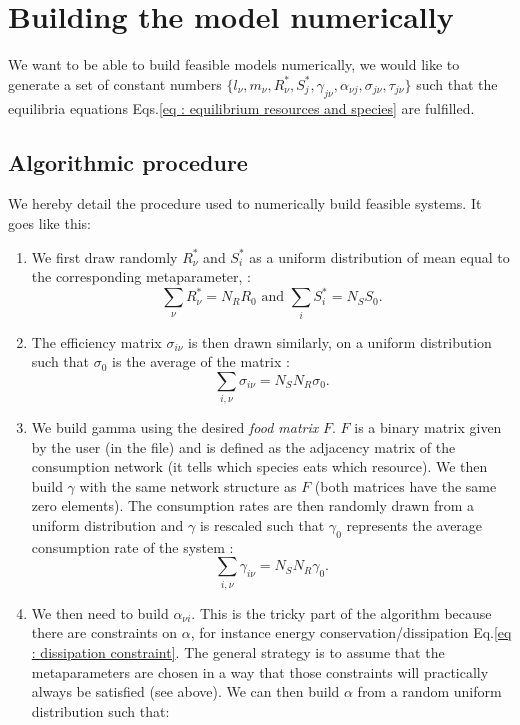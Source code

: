 \documentclass[12pt, titlepage]{report}
\begin{document}
\section{Building the model numerically}
We want to be able to build feasible models numerically, \ie we would like to generate a set of constant numbers $\{
l_\nu, m_\nu, R^*_\nu, S^*_j, \gamma_{j\nu}, \alpha_{\nu j}, \sigma_{j\nu}, \tau_{j\nu}\}$ such that the equilibria equations Eqs.\eqref{eq : equilibrium resources and species} are fulfilled.


\subsection{Algorithmic procedure}
We hereby detail the procedure used to numerically build feasible systems. It goes like this:
\begin{enumerate}
  \item We first draw randomly $R^*_\nu$
  and $S^*_i$ as a uniform distribution of mean equal to the corresponding metaparameter, \ie :
  \begin{equation}
    \sum_\nu R^*_\nu = N_R R_0 \text{ and } \sum_i S^*_i = N_S S_0.
  \end{equation}
  \item The efficiency matrix $\sigma_{i\nu}$ is then drawn similarly, on a uniform distribution such that $\sigma_0$ is the average of the matrix :
  \begin{equation}
    \sum_{i,\nu} \sigma_{i\nu} = N_S N_R \sigma_0.
  \end{equation}
  \item We build gamma using the desired \textit{food matrix} $F$. $F$ is a binary matrix given by the user (in the  file) and is defined as the adjacency matrix of the consumption network (\ie it tells which species eats which resource). We then build $\gamma$ with the same network structure as $F$ (\ie both matrices have the same zero elements). The consumption rates are then randomly drawn from a uniform distribution and $\gamma$ is rescaled such that $\gamma_0$ represents the average consumption rate of the system :
  \begin{equation}
    \sum_{i,\nu} \gamma_{i\nu} = N_S N_R \gamma_0.
  \end{equation}
  \item We then need to build $\alpha_{\nu i}$. This is the tricky part of the algorithm because there are constraints on $\alpha$, for instance energy conservation/dissipation Eq.\eqref{eq : dissipation constraint}. The general strategy is to assume that the metaparameters are chosen in a way that those constraints will practically always be satisfied (see above). We can then build $\alpha$ from a random uniform distribution such that:

\end{enumerate}
\end{document}
